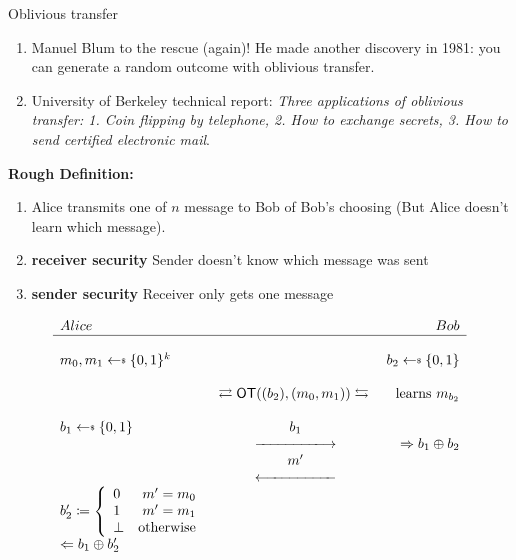\documentclass{beamer}
\newcommand\getsdollar{\mathrel{{\leftarrow}\vcenter{\hbox{\tiny\rmfamily\upshape\$}}}}
\begin{document}
\begin{frame}{Oblivious transfer}
    \pause
    \begin{enumerate}
        \item  Manuel Blum to the rescue (again)! He made another discovery in 1981: you can generate a random outcome with oblivious transfer.
        \item  University of Berkeley technical report: \textit{Three applications of oblivious transfer: 1. Coin flipping by telephone, 2. How to exchange secrets, 3. How to send certified electronic mail}.
    \end{enumerate}

    \linebreak
    
    \pause
    \textbf{Rough Definition:}
    \begin{enumerate}
        \item Alice transmits one of $n$ message to Bob of Bob's choosing (But Alice doesn't learn which message).
        \item \textbf{receiver security} Sender doesn't know which message was sent
        \item \textbf{sender security} Receiver only gets one message
    \end{enumerate}
    
\end{frame}


\begin{frame}

\begin{figure}[!htb]
    \centering
    \[
\begin{array}{l c r}
Alice \hspace{4em} & & Bob \\
\hline \\
m_0,m_1 \getsdollar{} \{0,1\}^{k} &  &  b_2 \getsdollar{} \{0,1\}\\
&  & \\
 &  \rightleftarrows{} \textsf{OT}((b_2), (m_0,m_1)) \leftrightarrows{} & \text{learns $m_{b_2}$}  \\
& & \\
b_1 \getsdollar{} \{0,1\} &  b_1 & \\
 & \xlongrightarrow{\hspace{5em}} &\Rightarrow b_1 \oplus b_2 \\
& m' & \\
& \xlongleftarrow{\hspace{5em}} & \\
 b_2' \coloneqq \left\{ \begin{array}{l r}
         0  & m' = m_0 \\
         1 & m' = m_1  \\
         \bot & \text{otherwise} \\ \end{array} \right.
         & & \\
\Leftarrow b_1 \oplus b_2'  & & 
\end{array}
\]
\end{figure}

    
\end{frame}
\end{document}
